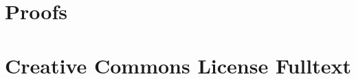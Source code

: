 \documentclass[letter, 11pt, onesided]{memoir}
\renewcommand{\chapnumfont}{\normalfont\huge\sffamily\bfseries}
\renewcommand{\printchaptername}{\chapnumfont Chapter}
\numberwithin{dummy}{section}
\theoremstyle{orangenumbox}
\theoremstyle{ocrenumbox}
\theoremstyle{blacknumex}
\theoremstyle{blacknumbox}
\theoremstyle{ocrenum}
\begin{document}
\appendix
\renewcommand{\printchaptername}{\chapnumfont Appendix}
\chapter{Proofs}
	\label{APPENDIX-proofstyle}
	

\chapter{Creative Commons License Fulltext}
	\label{APPENDIX-license}
	

\backmatter


% 
% 
\end{document}
